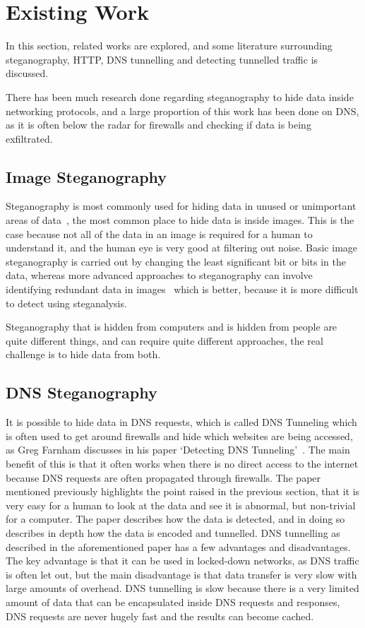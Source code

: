 \section{Existing Work}
In this section, related works are explored, and some literature surrounding steganography, HTTP, DNS tunnelling and detecting tunnelled traffic is discussed.

There has been much research done regarding steganography to hide data inside networking protocols, and a large proportion of this work has been done on DNS, as it is often below the radar for firewalls and checking if data is being exfiltrated.
\subsection{Image Steganography}
Steganography is most commonly used for hiding data in unused or unimportant areas of data~\cite{exploringsteno}, the most common place to hide data is inside images. This is the case because not all of the data in an image is required for a human to understand it, and the human eye is very good at filtering out noise.
Basic image steganography is carried out by changing the least significant bit or bits in the data, whereas more advanced approaches to steganography can involve identifying redundant data in images~\cite{introsteno} which is better, because it is more difficult to detect using steganalysis.

Steganography that is hidden from computers and is hidden from people are quite different things, and can require quite different approaches, the real challenge is to hide data from both.

\subsection{DNS Steganography}
It is possible to hide data in DNS requests, which is called DNS Tunneling which is often used to get around firewalls and hide which websites are being accessed, as Greg Farnham discusses in his paper `Detecting DNS Tunneling'~\cite{detectingdns}. The main benefit of this is that it often works when there is no direct access to the internet because DNS requests are often propagated through firewalls.
The paper mentioned previously highlights the point raised in the previous section, that it is very easy for a human to look at the data and see it is abnormal, but non-trivial for a computer.
The paper describes how the data is detected, and in doing so describes in depth how the data is encoded and tunnelled.
DNS tunnelling as described in the aforementioned paper has a few advantages and disadvantages.
The key advantage is that it can be used in locked-down networks, as DNS traffic is often let out, but the main disadvantage is that data transfer is very slow with large amounts of overhead.
DNS tunnelling is slow because there is a very limited amount of data that can be encapsulated inside DNS requests and responses, DNS requests are never hugely fast and the results can become cached.
